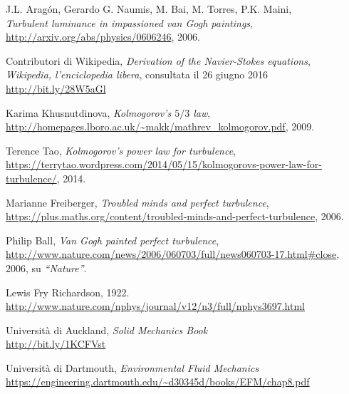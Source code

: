 \documentclass[12pt,a4paper]{article}
\numberwithin{equation}{section}
\begin{document}
\newpage

\tableofcontents

\begin{thebibliography}{11}

  J.L. Aragón, Gerardo G. Naumis, M. Bai, M. Torres, P.K. Maini, \\
  \emph{Turbulent luminance in impassioned van Gogh paintings}, \\
  \url{http://arxiv.org/abs/physics/0606246}, 
  2006.
  
  Contributori di Wikipedia, \emph{Derivation of the Navier-Stokes equations},\\
  \emph{Wikipedia, l'enciclopedia libera}, consultata il 26 giugno 2016 \\
  \url{http://bit.ly/28W5aGl}

  Karima Khusnutdinova, 
  \emph{Kolmogorov's $5/3$ law}, \\
  \url{http://homepages.lboro.ac.uk/~makk/mathrev_kolmogorov.pdf},
  2009.
  
  Terence Tao,
  \emph{Kolmogorov’s power law for turbulence}, \\
  \url{https://terrytao.wordpress.com/2014/05/15/kolmogorovs-power-law-for-turbulence/}, 2014.

  Marianne Freiberger, 
  \emph{Troubled minds and perfect turbulence}, \\
  \url{https://plus.maths.org/content/troubled-minds-and-perfect-turbulence},
  2006.
  
  Philip Ball, 
  \emph{Van Gogh painted perfect turbulence}, \\
  \url{http://www.nature.com/news/2006/060703/full/news060703-17.html#close},
  2006,
  su \emph{``Nature''}.
  
  Lewis Fry Richardson, 1922.
  \url{http://www.nature.com/nphys/journal/v12/n3/full/nphys3697.html}

  Università di Auckland, \emph{Solid Mechanics Book}\\
  \url{http://bit.ly/1KCFVst}

  Università di Dartmouth, \emph{Environmental Fluid Mechanics}\\
  \url{https://engineering.dartmouth.edu/~d30345d/books/EFM/chap8.pdf}



\end{thebibliography}
\end{document}

